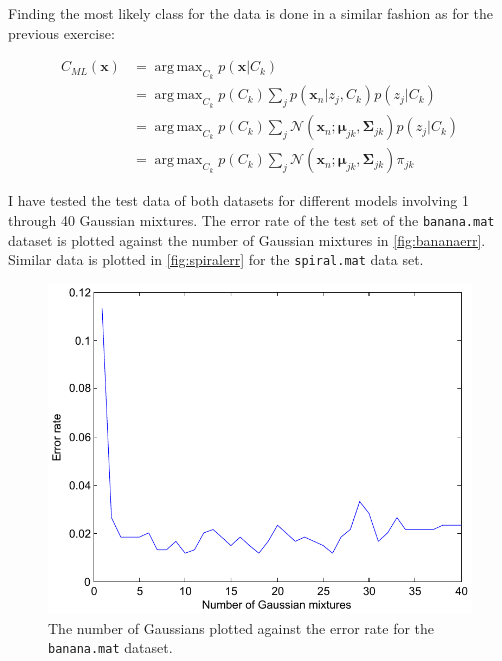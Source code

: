 \documentclass[a4paper,11pt]{article}
\DeclareMathOperator*{\argmax}{arg\,max}
\newcommand{\V}[1]{\ensuremath{\mathbf{#1}}}
\newcommand{\ck}{\ensuremath{C_k}}
\newcommand{\cML}{\ensuremath{C_{ML}}}
\newcommand{\mean}{\ensuremath{\boldsymbol{\mu}}}
\newcommand{\cov}{\ensuremath{\boldsymbol{\Sigma}}}
\begin{document}
Finding the most likely class for the data is done in a similar fashion as for the previous exercise:

\begin{align*}
\cML(\V{x}) &= \argmax_{\ck} p(\V{x} | \ck) \\
    &= \argmax_{\ck} p(\ck) \sum_j p(\V{x}_n | z_j, \ck) p(z_j | \ck) \\
    &= \argmax_{\ck} p(\ck) \sum_j \mathcal{N}(\V{x}_n ; \mean_{jk}, \cov_{jk}) p(z_j | \ck) \\
    &= \argmax_{\ck} p(\ck) \sum_j \mathcal{N}(\V{x}_n ; \mean_{jk}, \cov_{jk}) \pi_{jk}
\end{align*}

I have tested the test data of both datasets for different models involving 1 through 40 Gaussian mixtures.  The error rate of the test set of the \texttt{banana.mat} dataset is plotted against the number of Gaussian mixtures in \autoref{fig:bananaerr}.  Similar data is plotted in \autoref{fig:spiralerr} for the \texttt{spiral.mat} data set.  

\begin{figure}
\begin{center}
\caption{The number of Gaussians plotted against the error rate for the \texttt{banana.mat} dataset.}
\label{fig:bananaerr}
\includegraphics[width=\textwidth]{bananaerr}
\end{center}
\end{figure}
\end{document}
